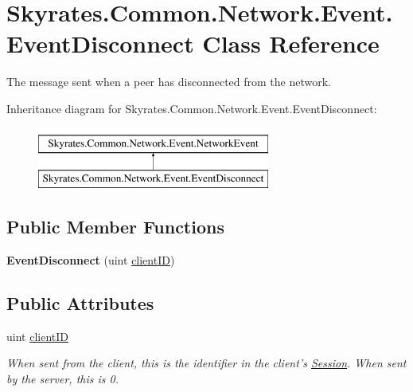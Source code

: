 \hypertarget{class_skyrates_1_1_common_1_1_network_1_1_event_1_1_event_disconnect}{\section{Skyrates.\-Common.\-Network.\-Event.\-Event\-Disconnect Class Reference}
\label{class_skyrates_1_1_common_1_1_network_1_1_event_1_1_event_disconnect}
}


The message sent when a peer has disconnected from the network.  


Inheritance diagram for Skyrates.\-Common.\-Network.\-Event.\-Event\-Disconnect\-:\begin{figure}[H]
\begin{center}
\leavevmode
\includegraphics[height=2.000000cm]{class_skyrates_1_1_common_1_1_network_1_1_event_1_1_event_disconnect}
\end{center}
\end{figure}
\subsection*{Public Member Functions}
\begin{DoxyCompactItemize}
\item 
\hypertarget{class_skyrates_1_1_common_1_1_network_1_1_event_1_1_event_disconnect_a2b78abb347e5432fd03603fbdfa89e6a}{{\bfseries Event\-Disconnect} (uint \hyperlink{class_skyrates_1_1_common_1_1_network_1_1_event_1_1_event_disconnect_a0bfa841aa477f6a472f27fb5ca6d298f}{client\-I\-D})}\label{class_skyrates_1_1_common_1_1_network_1_1_event_1_1_event_disconnect_a2b78abb347e5432fd03603fbdfa89e6a}

\end{DoxyCompactItemize}
\subsection*{Public Attributes}
\begin{DoxyCompactItemize}
\item 
uint \hyperlink{class_skyrates_1_1_common_1_1_network_1_1_event_1_1_event_disconnect_a0bfa841aa477f6a472f27fb5ca6d298f}{client\-I\-D}
\begin{DoxyCompactList}\small\item\em When sent from the client, this is the identifier in the client's \hyperlink{class_skyrates_1_1_common_1_1_network_1_1_session}{Session}. When sent by the server, this is 0. \end{DoxyCompactList}\end{DoxyCompactItemize}
